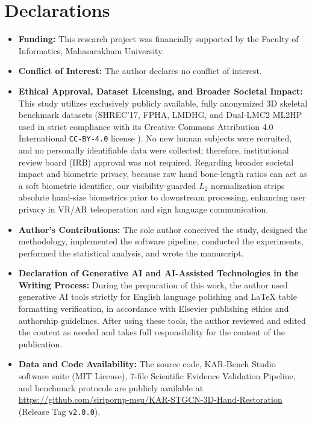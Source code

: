\documentclass[10pt,twocolumn]{article}
\begin{document}
\section*{Declarations}
\begin{itemize}
    \item \textbf{Funding:} This research project was financially supported by the Faculty of Informatics, Mahasarakham University.
    \item \textbf{Conflict of Interest:} The author declares no conflict of interest.
    \item \textbf{Ethical Approval, Dataset Licensing, and Broader Societal Impact:} This study utilizes exclusively publicly available, fully anonymized 3D skeletal benchmark datasets (SHREC'17, FPHA, LMDHG, and Dual-LMC2 ML2HP used in strict compliance with its Creative Commons Attribution 4.0 International \texttt{CC-BY-4.0} license \cite{gilmartin2024dual}). No new human subjects were recruited, and no personally identifiable data were collected; therefore, institutional review board (IRB) approval was not required. Regarding broader societal impact and biometric privacy, because raw hand bone-length ratios can act as a soft biometric identifier, our visibility-guarded $L_2$ normalization strips absolute hand-size biometrics prior to downstream processing, enhancing user privacy in VR/AR teleoperation and sign language communication.
    \item \textbf{Author's Contributions:} The sole author conceived the study, designed the methodology, implemented the software pipeline, conducted the experiments, performed the statistical analysis, and wrote the manuscript.
    \item \textbf{Declaration of Generative AI and AI-Assisted Technologies in the Writing Process:} During the preparation of this work, the author used generative AI tools strictly for English language polishing and LaTeX table formatting verification, in accordance with Elsevier publishing ethics and authorship guidelines. After using these tools, the author reviewed and edited the content as needed and takes full responsibility for the content of the publication.
    \item \textbf{Data and Code Availability:} The source code, KAR-Bench Studio software suite (MIT License), 7-file Scientific Evidence Validation Pipeline, and benchmark protocols are publicly available at \url{https://github.com/siripornp-msu/KAR-STGCN-3D-Hand-Restoration} (Release Tag \texttt{v2.0.0}).
\end{itemize}
\end{document}
